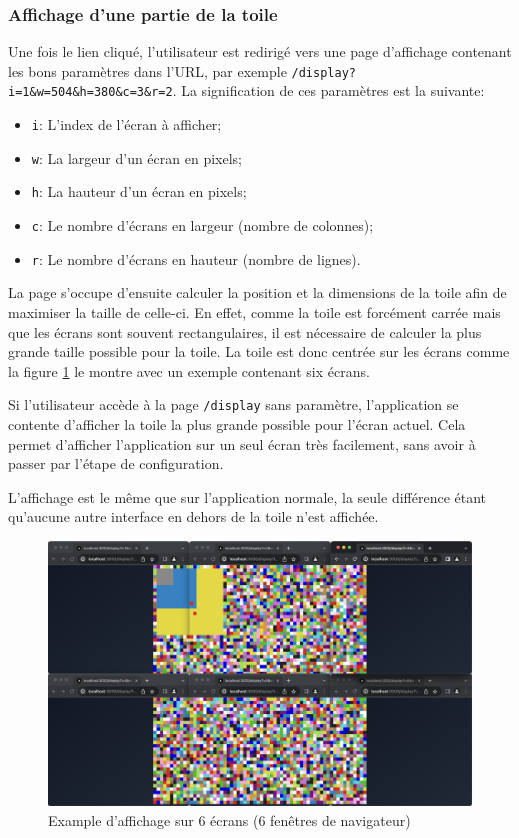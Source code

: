 \subsubsection{Affichage d'une partie de la toile}

Une fois le lien cliqué, l'utilisateur est redirigé vers une page d'affichage contenant les bons paramètres dans l'URL, par exemple \texttt{/display?i=1\&w=504\&h=380\&c=3\&r=2}. La signification de ces paramètres est la suivante:

\begin{itemize}
  \item \texttt{i}: L'index de l'écran à afficher;
  \item \texttt{w}: La largeur d'un écran en pixels;
  \item \texttt{h}: La hauteur d'un écran en pixels;
  \item \texttt{c}: Le nombre d'écrans en largeur (nombre de colonnes);
  \item \texttt{r}: Le nombre d'écrans en hauteur (nombre de lignes).
\end{itemize}

La page s'occupe d'ensuite calculer la position et la dimensions de la toile afin de maximiser la taille de celle-ci. En effet, comme la toile est forcément carrée mais que les écrans sont souvent rectangulaires, il est nécessaire de calculer la plus grande taille possible pour la toile. La toile est donc centrée sur les écrans comme la figure \ref{fig:display-mode-example} le montre avec un exemple contenant six écrans.

Si l'utilisateur accède à la page \texttt{/display} sans paramètre, l'application se contente d'afficher la toile la plus grande possible pour l'écran actuel. Cela permet d'afficher l'application sur un seul écran très facilement, sans avoir à passer par l'étape de configuration.

L'affichage est le même que sur l'application normale, la seule différence étant qu'aucune autre interface en dehors de la toile n'est affichée.

\begin{figure}[H]
  \centering
  \includegraphics[width=1\textwidth]{./assets/figures/display-mode-example.png}
  \caption{Example d'affichage sur 6 écrans (6 fenêtres de navigateur)}
  \label{fig:display-mode-example}
\end{figure}

